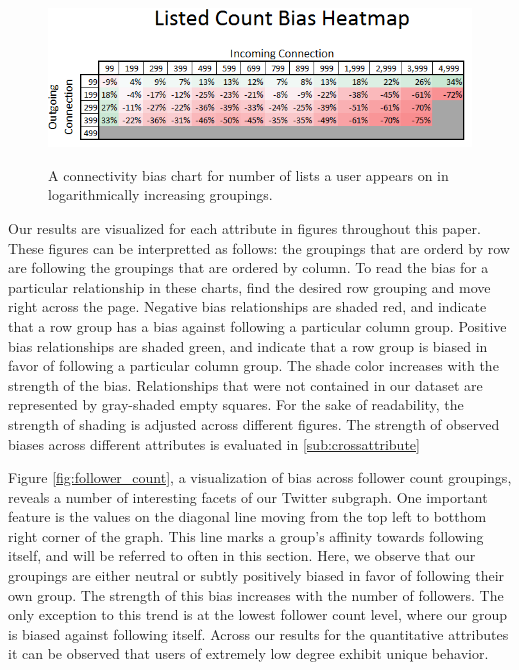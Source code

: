 \begin{figure}[t]
 \centering
 \includegraphics[bb=0 0 496 163,scale=.6]{./images/listed_count.png}
 \label{fig:listed_count}
 \caption{A connectivity bias chart for number of lists a user appears on in logarithmically increasing groupings.}
\end{figure}


Our results are visualized for each attribute in figures throughout this paper.  These figures can be interpretted as follows: the groupings that are orderd by row are following the groupings that are ordered by column.  To read the bias for a particular relationship in these charts, find the desired row grouping and move right across the page.  Negative bias relationships are shaded red, and indicate that a row group has a bias against following a particular column group.  Positive bias relationships are shaded green, and indicate that a row group is biased in favor of following a particular column group.  The shade color increases with the strength of the bias.  Relationships that were not contained in our dataset are represented by gray-shaded empty squares.  For the sake of readability, the strength of shading is adjusted across different figures.  The strength of observed biases across different attributes is evaluated in \ref{sub:crossattribute}

Figure \ref{fig:follower_count}, a visualization of bias across follower count groupings, reveals a number of interesting facets of our Twitter subgraph.  One important feature is the values on the diagonal line moving from the top left to botthom right corner of the graph.  This line marks a group's affinity towards following itself, and will be referred to often in this section.  Here, we observe that our groupings are either neutral or subtly positively biased in favor of following their own group.  The strength of this bias increases with the number of followers.  The only exception to this trend is at the lowest follower count level, where our group is biased against following itself.  Across our results for the quantitative attributes it can be observed that users of extremely low degree exhibit unique behavior.

